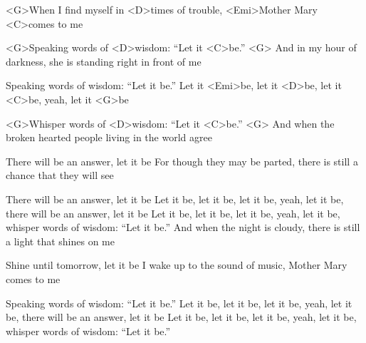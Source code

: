 

\zs
<G>When I find myself in <D>times of trouble,
<Emi>Mother Mary <C>comes to me

<G>Speaking words of <D>wisdom: ``Let it <C>be.'' <G>
\ks
\zs
And in my hour of darkness,
she is standing right in front of me

Speaking words of wisdom: ``Let it be.''
\ks
\zr
Let it <Emi>be, let it <D>be, let it <C>be, yeah, let it <G>be

<G>Whisper words of <D>wisdom: ``Let it <C>be.'' <G>
\kr
\zs
And when the broken hearted people
living in the world agree

There will be an answer, let it be
\ks
\zs
For though they may be parted,
there is still a chance that they will see

There will be an answer, let it be
\ks
\zr
Let it be, let it be, let it be, yeah, let it be,
there will be an answer, let it be
\kr
\zr
Let it be, let it be, let it be, yeah, let it be,
whisper words of wisdom: ``Let it be.''
\kr
\zs
And when the night is cloudy,
there is still a light that shines on me

Shine until tomorrow, let it be
\ks
\zs
I wake up to the sound of music,
Mother Mary comes to me

Speaking words of wisdom: ``Let it be.''
\ks
\zr
Let it be, let it be, let it be, yeah, let it be,
there will be an answer, let it be
\kr
\zr
Let it be, let it be, let it be, yeah, let it be,
whisper words of wisdom: ``Let it be.''
\kr

\kp
